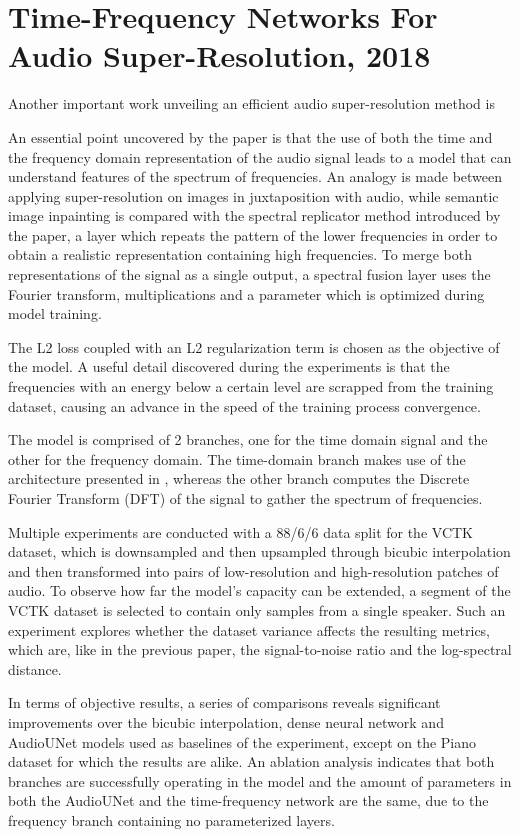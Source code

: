 \documentclass[conference]{IEEEtran}
\begin{document}
	
\section{Time-Frequency Networks For Audio Super-Resolution, 2018}
	Another important work unveiling an efficient audio super-resolution method is \textcite{timefrequencynetworks2018} 

	An essential point uncovered by the paper is that the use of both the time and the frequency domain representation of the audio signal leads to a model that can understand features of the spectrum of frequencies. An analogy is made between applying super-resolution on images in juxtaposition with audio, while semantic image inpainting is compared with the spectral replicator method introduced by the paper, a layer which repeats the pattern of the lower frequencies in order to obtain a realistic representation containing high frequencies. To merge both representations of the signal as a single output, a spectral fusion layer uses the Fourier transform, multiplications and a parameter which is optimized during model training. 

	The L2 loss coupled with an L2 regularization term is chosen as the objective of the model. A useful detail discovered during the experiments is that the frequencies with an energy below a certain level are scrapped from the training dataset, causing an advance in the speed of the training process convergence. 

	The model is comprised of 2 branches, one for the time domain signal and the other for the frequency domain. The time-domain branch makes use of the architecture presented in \textcite{kuleshov2017audio}, whereas the other branch computes the Discrete Fourier Transform (DFT) of the signal to gather the spectrum of frequencies. 

	Multiple experiments are conducted with a 88/6/6 data split for the VCTK dataset, which is downsampled and then upsampled through bicubic interpolation and then transformed into pairs of low-resolution and high-resolution patches of audio. To observe how far the model's capacity can be extended, a segment of the VCTK dataset is selected to contain only samples from a single speaker. Such an experiment explores whether the dataset variance affects the resulting metrics, which are, like in the previous paper, the signal-to-noise ratio and the log-spectral distance. 

	In terms of objective results, a series of comparisons reveals significant improvements over the bicubic interpolation, dense neural network and AudioUNet models used as baselines of the experiment, except on the Piano dataset for which the results are alike. An ablation analysis indicates that both branches are successfully operating in the model and the amount of parameters in both the AudioUNet and the time-frequency network are the same, due to the frequency branch containing no parameterized layers.
\end{document}
